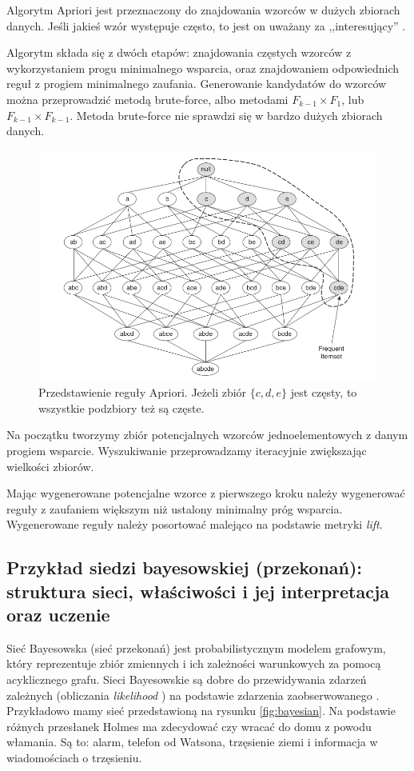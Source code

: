 \documentclass[wi]{zut}
\begin{document}
Algorytm Apriori jest przeznaczony do znajdowania wzorców w dużych zbiorach danych. Jeśli jakieś wzór występuje często, to jest on uważany za ,,interesujący'' \cite{Kolodziejczyk2020}.

Algorytm składa się z dwóch etapów: znajdowania częstych wzorców z wykorzystaniem progu minimalnego wsparcia, oraz znajdowaniem odpowiednich reguł z progiem minimalnego zaufania. Generowanie kandydatów do wzorców można przeprowadzić metodą brute-force, albo metodami $F_{k-1} \times F_1$, lub $F_{k-1} \times F_{k-1}$. Metoda brute-force nie sprawdzi się w bardzo dużych zbiorach danych.

\begin{figure}[H]
    \centering
    \includegraphics[width=0.5\linewidth]{images/apriori.png}
    \caption{Przedstawienie reguły Apriori. Jeżeli zbiór $\{c, d, e\}$ jest częsty, to wszystkie podzbiory też są częste.}
    \label{fig:apriori}
\end{figure}


Na początku tworzymy zbiór potencjalnych wzorców jednoelementowych z danym progiem wsparcie. Wyszukiwanie przeprowadzamy iteracyjnie zwiększając wielkości zbiorów. 

Mając wygenerowane potencjalne wzorce z pierwszego kroku należy wygenerować reguły z zaufaniem większym niż ustalony minimalny próg wsparcia. Wygenerowane reguły należy posortować malejąco na podstawie metryki \emph{lift}.

\subsection{Przykład siedzi bayesowskiej (przekonań): struktura sieci, właściwości i jej interpretacja oraz uczenie}

Sieć Bayesowska (sieć przekonań) jest probabilistycznym modelem grafowym, który reprezentuje zbiór zmiennych i ich zależności warunkowych za pomocą acyklicznego grafu. Sieci Bayesowskie są dobre do przewidywania zdarzeń zależnych (obliczania \emph{likelihood} \cite{wiki:Likelihood_function}) na podstawie zdarzenia zaobserwowanego 
\cite{wiki:Bayesian_network}. Przykładowo mamy sieć przedstawioną na rysunku \ref{fig:bayesian}. Na podstawie różnych przesłanek Holmes ma zdecydować czy wracać do domu z powodu włamania. Są to: alarm, telefon od Watsona, trzęsienie ziemi i informacja w wiadomościach o trzęsieniu.
\end{document}
